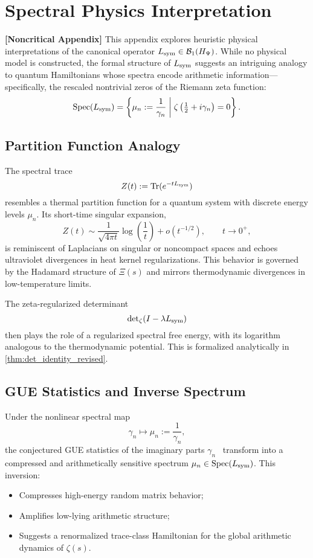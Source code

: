 \section{Spectral Physics Interpretation}
\label{app:spectral_physics_link}

\noindent\textbf{[Noncritical Appendix]}  
This appendix explores heuristic physical interpretations of the canonical operator \( L_{\mathrm{sym}} \in \mathcal{B}_1(H_{\Psi}) \). While no physical model is constructed, the formal structure of \( L_{\mathrm{sym}} \) suggests an intriguing analogy to quantum Hamiltonians whose spectra encode arithmetic information—specifically, the rescaled nontrivial zeros of the Riemann zeta function:
\[
\operatorname{Spec}(L_{\mathrm{sym}}) = \left\{ \mu_n := \frac{1}{\gamma_n} \;\middle|\; \zeta\left(\tfrac{1}{2} + i\gamma_n\right) = 0 \right\}.
\]

\subsection*{Partition Function Analogy}

The spectral trace
\[
Z(t) := \operatorname{Tr}(e^{-t L_{\mathrm{sym}}})
\]
resembles a thermal partition function for a quantum system with discrete energy levels \( \mu_n \). Its short-time singular expansion,
\[
Z(t) \sim \frac{1}{\sqrt{4\pi t}} \log\left( \frac{1}{t} \right) + o(t^{-1/2}), \qquad t \to 0^+,
\]
is reminiscent of Laplacians on singular or noncompact spaces and echoes ultraviolet divergences in heat kernel regularizations. This behavior is governed by the Hadamard structure of \( \Xi(s) \) and mirrors thermodynamic divergences in low-temperature limits.

The zeta-regularized determinant
\[
\det\nolimits_{\zeta}(I - \lambda L_{\mathrm{sym}})
\]
then plays the role of a regularized spectral free energy, with its logarithm analogous to the thermodynamic potential. This is formalized analytically in \cref{thm:det_identity_revised}.

\subsection*{GUE Statistics and Inverse Spectrum}

Under the nonlinear spectral map
\[
\gamma_n \longmapsto \mu_n := \frac{1}{\gamma_n},
\]
the conjectured GUE statistics of the imaginary parts \( \gamma_n \)~\cite{Montgomery1973PairCorrelation, Berry1986RiemannSpectra} transform into a compressed and arithmetically sensitive spectrum \( \mu_n \in \operatorname{Spec}(L_{\mathrm{sym}}) \). This inversion:
\begin{itemize}
  \item Compresses high-energy random matrix behavior;
  \item Amplifies low-lying arithmetic structure;
  \item Suggests a renormalized trace-class Hamiltonian for the global arithmetic dynamics of \( \zeta(s) \).
\end{itemize}

